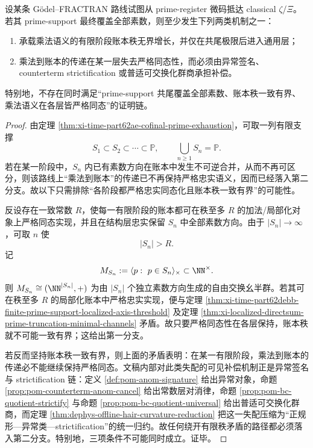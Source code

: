 \begin{theorem}[异常项与无穷秩账本的二择一]\label{thm:xi-time-part62ae-anomaly-infinite-rank-dichotomy}
设某条 Gödel--FRACTRAN 路线试图从 prime-register 微码抵达 classical \(\zeta\)/\(\Xi\)。若其 prime-support 最终覆盖全部素数，则至少发生下列两类机制之一：
\begin{enumerate}
  \item 承载乘法语义的有限阶段账本秩无界增长，并仅在共尾极限后进入通用层；
  \item 乘法到账本的传递在某一层失去严格同态性，而必须由异常签名、counterterm strictification 或普适可交换化群商承担补偿。
\end{enumerate}
特别地，不存在同时满足“prime-support 共尾覆盖全部素数、账本秩一致有界、乘法语义在各层皆严格同态”的证明链。
\end{theorem}
\begin{proof}
由定理 \ref{thm:xi-time-part62ae-cofinal-prime-exhaustion}，可取一列有限支撑
\[
S_1\subset S_2\subset\cdots\subset\mathbb P,
\qquad
\bigcup_{n\ge 1}S_n=\mathbb P.
\]
若在某一阶段中，\(S_n\) 内已有素数方向在账本中发生不可逆合并，从而不再可区分，则该路线上“乘法到账本”的传递已不再保持严格忠实语义，因而已经落入第二分支。故以下只需排除“各阶段都严格忠实同态化且账本秩一致有界”的可能性。

反设存在一致常数 \(R\)，使每一有限阶段的账本都可在秩至多 \(R\) 的加法/局部化对象上严格同态实现，并且在结构层忠实保留 \(S_n\) 中全部素数方向。由于 \(|S_n|\to\infty\)，可取 \(n\) 使
\[
|S_n|>R.
\]
记
\[
M_{S_n}:=\langle p:\ p\in S_n\rangle_{\times}\subset \NN^\times.
\]
则 \(M_{S_n}\cong (\NN^{|S_n|},+)\) 为由 \(|S_n|\) 个独立素数方向生成的自由交换幺半群。若其可在秩至多 \(R\) 的局部化账本中严格忠实实现，便与定理 \ref{thm:xi-time-part62debb-finite-prime-support-localized-axis-threshold} 及定理 \ref{thm:xi-localized-directsum-prime-truncation-minimal-channels} 矛盾。故只要严格同态性在各层保持，账本秩就不可能一致有界；这给出第一分支。

若反而坚持账本秩一致有界，则上面的矛盾表明：在某一有限阶段，乘法到账本的传递必不能继续保持严格同态。文稿内部对此类失配的可见补偿机制正是异常签名与 strictification 链：定义 \ref{def:pom-anom-signature} 给出异常对象，命题 \ref{prop:pom-counterterm-anom-cancel} 给出常数层对消律，命题 \ref{prop:pom-bc-quotient-strictify} 与命题 \ref{prop:pom-bc-quotient-universal} 给出普适可交换化群商，而定理 \ref{thm:dephys-offline-hair-curvature-reduction} 把这一失配压缩为“正规形—异常类—strictification”的统一归约。故任何绕开有限秩矛盾的路径都必须落入第二分支。特别地，三项条件不可能同时成立。证毕。
\end{proof}


